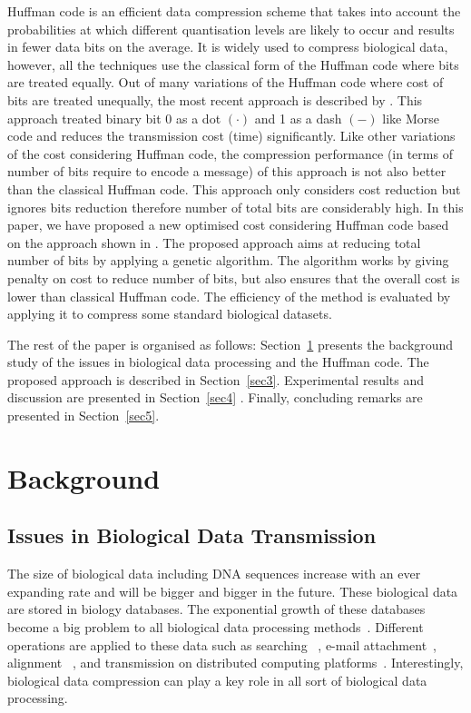 \documentclass[twocolumn,12pt,a4paper]{article}
\begin{document}
Huffman code \citep{Huff51} is an efficient data compression scheme that takes into account the probabilities at which different quantisation levels are likely to occur and results in fewer data bits on the average. It is widely used to compress biological data, however, all the techniques use the classical form of the Huffman code where bits are treated equally. Out of many variations of the Huffman code where cost of bits are treated unequally, the most recent approach is described by \citet{Kab14}. This approach treated binary bit 0 as a dot $\left(\cdot\right)$ and 1 as a dash $\left(-\right)$ like Morse code and reduces the transmission cost (time) significantly. Like other variations of the cost considering Huffman code, the compression performance (in terms of number of bits require to encode a message) of this approach is not also better than the classical Huffman code. This approach only considers cost reduction but ignores bits reduction therefore number of total bits are considerably high. In this paper, we have proposed a new optimised cost considering Huffman code based on the approach shown in \citep{Kab14}. %
The proposed approach aims at reducing total number of bits   by applying a genetic algorithm. The algorithm works by giving penalty on cost to reduce number of bits, but also ensures that the overall cost is lower than classical Huffman code.  The efficiency of the method is evaluated by applying it to compress some standard biological datasets.         

The rest of the paper is organised as follows: Section~\ref{sec2} presents the background study of the issues in biological data processing and the Huffman code. The proposed approach is described in Section~\ref{sec3}. Experimental results and discussion are presented in Section~\ref{sec4} . Finally, concluding remarks are presented in Section~\ref{sec5}.

\section{Background}
\label{sec2}
\subsection{Issues in Biological Data Transmission}
The size of biological data including DNA sequences increase with an ever expanding rate and will be bigger and bigger in the future. These biological data are stored in biology databases. The exponential growth of these databases become a big problem to all biological data processing methods~\citep{Doug08}.
Different operations are applied to these data such as searching ~\citep{val10}, e-mail attachment~\citep{chr09}, alignment ~\citep{che03}, and transmission on distributed computing platforms~\citep{cha14}. Interestingly, biological data compression can play a key role in all sort of biological data processing. 
\end{document}
